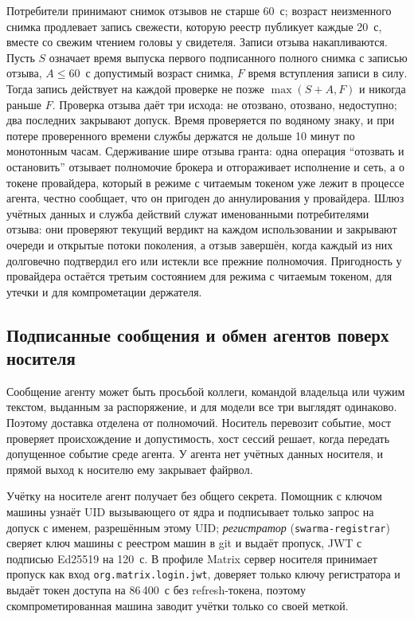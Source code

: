 \documentclass[10pt,a4paper]{article}
\begin{document}
Потребители принимают снимок отзывов не старше 60~с; возраст неизменного снимка продлевает запись свежести, которую реестр публикует каждые 20~с, вместе со свежим чтением головы у свидетеля. Записи отзыва накапливаются. Пусть $S$ означает время выпуска первого подписанного полного снимка с записью отзыва, $A\le60$~с допустимый возраст снимка, $F$ время вступления записи в силу. Тогда запись действует на каждой проверке не позже $\max(S+A,F)$ и никогда раньше $F$. Проверка отзыва даёт три исхода: не отозвано, отозвано, недоступно; два последних закрывают допуск. Время проверяется по водяному знаку, и при потере проверенного времени службы держатся не дольше 10 минут по монотонным часам. Сдерживание шире отзыва гранта: одна операция ``отозвать и остановить'' отзывает полномочие брокера и отгораживает исполнение и сеть, а о токене провайдера, который в режиме с читаемым токеном уже лежит в процессе агента, честно сообщает, что он пригоден до аннулирования у провайдера. Шлюз учётных данных и служба действий служат именованными потребителями отзыва: они проверяют текущий вердикт на каждом использовании и закрывают очереди и открытые потоки поколения, а отзыв завершён, когда каждый из них долговечно подтвердил его или истекли все прежние полномочия. Пригодность у провайдера остаётся третьим состоянием для режима с читаемым токеном, для утечки и для компрометации держателя.

\subsection{Подписанные сообщения и обмен агентов поверх носителя}
\label{sec:messages}

Сообщение агенту может быть просьбой коллеги, командой владельца или чужим текстом, выданным за распоряжение, и для модели все три выглядят одинаково. Поэтому доставка отделена от полномочий. Носитель перевозит событие, мост проверяет происхождение и допустимость, хост сессий решает, когда передать допущенное событие среде агента. У агента нет учётных данных носителя, и прямой выход к носителю ему закрывает файрвол.

Учётку на носителе агент получает без общего секрета. Помощник с ключом машины узнаёт UID вызывающего от ядра и подписывает только запрос на допуск с именем, разрешённым этому UID; \emph{регистратор} (\texttt{swarma-registrar}) сверяет ключ машины с реестром машин в git и выдаёт пропуск, JWT с подписью Ed25519 на 120~с. В профиле Matrix сервер носителя принимает пропуск как вход \texttt{org.matrix.login.jwt}, доверяет только ключу регистратора и выдаёт токен доступа на 86\,400~с без refresh-токена, поэтому скомпрометированная машина заводит учётки только со своей меткой.
\end{document}
